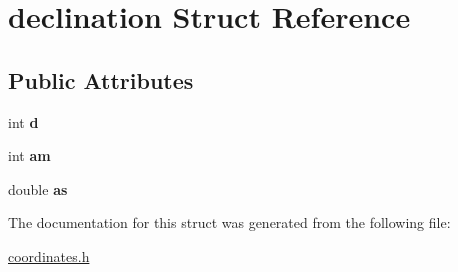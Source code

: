 \hypertarget{structdeclination}{}\section{declination Struct Reference}
\label{structdeclination}
\subsection*{Public Attributes}
\begin{DoxyCompactItemize}
\item 
\mbox{\label{structdeclination_a6d57698dc945a9e462acd901876eacbe}} 
int {\bfseries d}
\item 
\mbox{\label{structdeclination_a831039a43f7b7d21fb5e940a5e4d3c37}} 
int {\bfseries am}
\item 
\mbox{\label{structdeclination_a724a25c740ad71b350915545f0d20934}} 
double {\bfseries as}
\end{DoxyCompactItemize}


The documentation for this struct was generated from the following file\+:\begin{DoxyCompactItemize}
\item 
\mbox{\hyperlink{coordinates_8h}{coordinates.\+h}}\end{DoxyCompactItemize}
